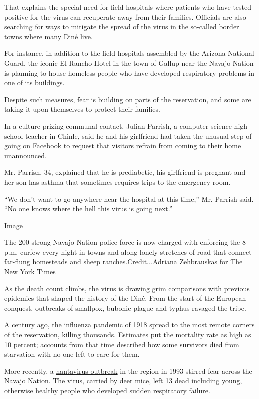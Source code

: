 That explains the special need for field hospitals where patients who
have tested positive for the virus can recuperate away from their
families. Officials are also searching for ways to mitigate the spread
of the virus in the so-called border towns where many Diné live.

For instance, in addition to the field hospitals assembled by the
Arizona National Guard, the iconic El Rancho Hotel in the town of Gallup
near the Navajo Nation is planning to house homeless people who have
developed respiratory problems in one of its buildings.

Despite such measures, fear is building on parts of the reservation, and
some are taking it upon themselves to protect their families.

In a culture prizing communal contact, Julian Parrish, a computer
science high school teacher in Chinle, said he and his girlfriend had
taken the unusual step of going on Facebook to request that visitors
refrain from coming to their home unannounced.

Mr. Parrish, 34, explained that he is prediabetic, his girlfriend is
pregnant and her son has asthma that sometimes requires trips to the
emergency room.

``We don't want to go anywhere near the hospital at this time,'' Mr.
Parrish said. ``No one knows where the hell this virus is going next.''

Image

The 200-strong Navajo Nation police force is now charged with enforcing
the 8 p.m. curfew every night in towns and along lonely stretches of
road that connect far-flung homesteads and sheep
ranches.Credit...Adriana Zehbrauskas for The New York Times

As the death count climbs, the virus is drawing grim comparisons with
previous epidemics that shaped the history of the Diné. From the start
of the European conquest, outbreaks of smallpox, bubonic plague and
typhus ravaged the tribe.

A century ago, the influenza pandemic of 1918 spread to the
\href{https://www.jstor.org/stable/pdf/10.5250/amerindiquar.38.4.0459.pdf?refreqid=excelsior\%3A70667e3ff079d8c69050297f2972d443}{most
remote corners} of the reservation, killing thousands. Estimates put the
mortality rate as high as 10 percent; accounts from that time described
how some survivors died from starvation with no one left to care for
them.

More recently, a
\href{https://www.aaas.org/virus-rocked-four-corners-reemerges}{hantavirus
outbreak} in the region in 1993 stirred fear across the Navajo Nation.
The virus, carried by deer mice, left 13 dead including young, otherwise
healthy people who developed sudden respiratory failure.

